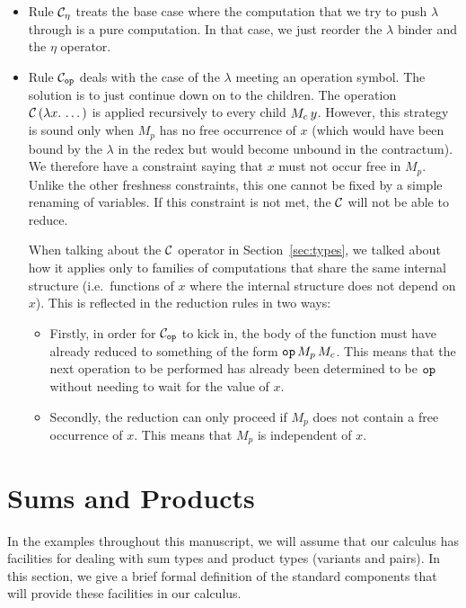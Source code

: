 \begin{itemize}
\item Rule $\mathcal{C}_\eta$ treats the base case where the computation that we
  try to push $\lambda$ through is a pure computation. In that case, we
  just reorder the $\lambda$ binder and the $\eta$ operator.

\item Rule $\mathcal{C}_{\mathtt{op}}$ deals with the case of the $\lambda$ meeting an
  operation symbol. The solution is to just continue down on to the
  children. The operation $\mathcal{C}\,(\lambda x.\, \dots)$ is applied
  recursively to every child $M_c\,y$. However, this strategy is sound
  only when $M_p$ has no free occurrence of $x$ (which would have been
  bound by the $\lambda$ in the redex but would become unbound in the
  contractum). We therefore have a constraint saying that $x$ must not
  occur free in $M_p$. Unlike the other freshness constraints, this one
  cannot be fixed by a simple renaming of variables. If this constraint is
  not met, the $\mathcal{C}$ will not be able to reduce.

  When talking about the $\mathcal{C}$ operator in Section~\ref{sec:types}, we
  talked about how it applies only to families of computations that share
  the same internal structure (i.e.\ functions of $x$ where the internal
  structure does not depend on $x$). This is reflected in the reduction
  rules in two ways:
  \begin{itemize}
  \item Firstly, in order for $\mathcal{C}_{\mathtt{op}}$ to kick in, the body of the
    function must have already reduced to something of the form
    $\mathtt{op}\,M_p\,M_c$. This means that the next operation to be
    performed has already been determined to be $\mathtt{op}$ without needing
    to wait for the value of $x$.
  \item Secondly, the reduction can only proceed if $M_p$ does not contain
    a free occurrence of $x$. This means that $M_p$ is independent of $x$.
  \end{itemize}
\end{itemize}


\section{Sums and Products}

In the examples throughout this manuscript, we will assume that our
calculus has facilities for dealing with sum types and product types
(variants and pairs). In this section, we give a brief formal definition of
the standard components that will provide these facilities in our calculus.


